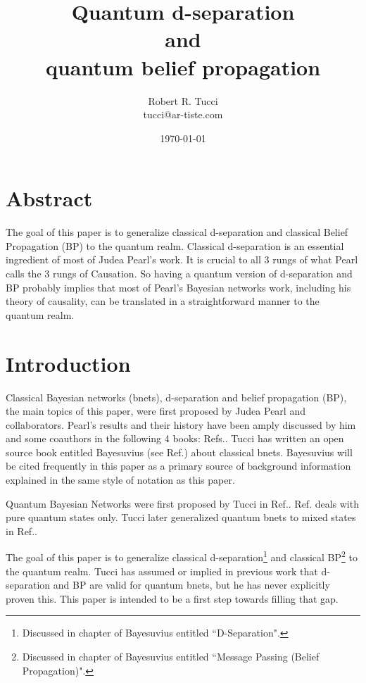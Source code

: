 \documentclass[12pt]{article}
\begin{document}
\title{Quantum d-separation\\
and\\
quantum belief propagation}
\date{ \today}
\author{Robert R. Tucci\\
        tucci@ar-tiste.com}
\maketitle
\vskip2cm
\section*{Abstract}
The goal of this paper is to generalize
classical d-separation
 and 
classical Belief Propagation (BP)
 to the quantum realm.
Classical d-separation
is 
an essential ingredient of most of Judea Pearl's 
work. It 
is crucial
to all 3 rungs of 
what Pearl calls the 3 rungs
of Causation.
So having a quantum version
of d-separation
and BP
probably 
implies
that most of Pearl's
Bayesian networks
work, 
including
his theory of
causality, 
can be translated
in a straightforward 
manner to
the quantum realm.
\newpage
\section{Introduction}

Classical Bayesian networks (bnets),
 d-separation
and belief propagation (BP), the main topics 
of this paper, were first proposed  
by Judea Pearl and collaborators. Pearl's results 
and their history
have been amply discussed by
him and some coauthors in 
the following 4 books:
Refs.\cite{pearl-1988book,pearl-2013book,
pearl-primer,book-why}.
Tucci has written 
 an open source book entitled
Bayesuvius (see Ref.\cite{bayesuvius}) about
classical bnets.
Bayesuvius will
be cited frequently in this paper as
a primary source of 
background information
explained in the same style
of notation as this paper. 

Quantum Bayesian Networks were 
first proposed by Tucci in Ref.\cite{qbnets1}.
Ref.\cite{qbnets1} deals with pure quantum states only.
Tucci later generalized quantum bnets 
to mixed states
in
Ref.\cite{qbnets-mixed}.

The goal of this paper is to generalize
classical d-separation\footnote{Discussed 
in chapter of Bayesuvius entitled 
``D-Separation".}
 and 
classical BP\footnote{Discussed 
in chapter of Bayesuvius entitled 
``Message Passing (Belief Propagation)".}
 to the quantum realm.
Tucci has assumed or implied
in previous work that d-separation
and BP
are valid for quantum bnets, but he
has never explicitly proven  this.
This paper is intended to be a first
step towards filling that gap.
\end{document}
